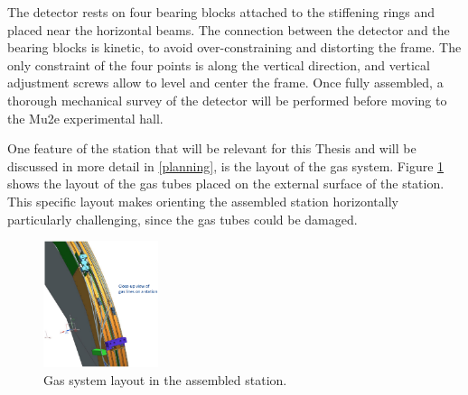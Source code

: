 The detector rests on four bearing blocks attached to the 
stiffening rings and placed near the horizontal beams.
The connection between the detector and the bearing blocks 
is kinetic, to avoid over-constraining and distorting the frame. 
The only constraint of the four points is along the vertical 
direction, and vertical adjustment screws allow to level and 
center the frame. Once fully assembled, a thorough mechanical 
survey of the detector will be performed before moving to the Mu2e experimental hall. 

One feature of the station that will be relevant for this Thesis 
and will be discussed in more detail in \ref{planning}, is the layout of the gas system. 
Figure \ref{fig:gassystem} shows the layout of the gas tubes 
placed on the external surface of the station. 
This specific layout makes orienting the assembled 
station horizontally particularly challenging, since the gas tubes could be damaged.

\begin{figure}[!h]
    \centering
    \includegraphics[width =0.3\textwidth]{figures/png/Screenshot_20240706_163631.png}
    \caption{Gas system layout in the assembled station.}
    \label{fig:gassystem}
\end{figure}

